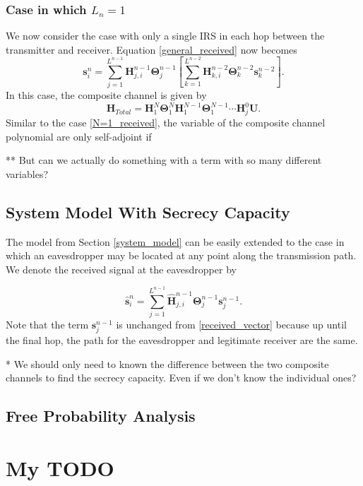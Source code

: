\documentclass[12pt,a4paper]{report}
\begin{document}
\subsection{Case in which $L_n=1$}
We now consider the case with only a single IRS in each hop between the transmitter and receiver. 
Equation \ref{general_received} now becomes 
\begin{equation}\label{L_n=1_received}
\mathbf{s}^{n}_{i} = \sum_{j = 1}^{L^{n-1}} \mathbf{H}^{n-1}_{j,i}\boldsymbol{\Theta}^{n-1}_{j} \left[
\sum_{k = 1}^{L^{n-2}} \mathbf{H}^{n-2}_{k,i}\boldsymbol{\Theta}^{n-2}_{k}\mathbf{s}^{n-2}_{k} \right].
\end{equation}
In this case, the composite channel is given by 
\begin{equation}
\mathbf{H}_{Total} = \mathbf{H}^{N}_{1}\boldsymbol{\Theta}^{N}_{1}\mathbf{H}^{N-1}_{1}\boldsymbol{\Theta}^{N-1}_{1} \cdots  
\mathbf{H}^{0}_{j}\mathbf{U}.
\end{equation}
Similar to the case \ref{N=1_received}, the variable of the composite channel polynomial are only self-adjoint if 

** But can we actually do something with a term with so many different variables?

\section{System Model With Secrecy Capacity}
The model from Section \ref{system_model} can be easily extended to the case in which an eavesdropper may be located at any point along the transmission path. We denote the received signal at the eavesdropper by

\begin{equation}\label{general_received}
\hat{\mathbf{s}}^{n}_{i} = \sum_{j = 1}^{L^{n-1}} \hat{\mathbf{H}}^{n-1}_{j,i}\boldsymbol{\Theta}^{n-1}_{j} \mathbf{s}^{n-1}_{j}.
\end{equation}
Note that the term $\mathbf{s}^{n-1}_{j}$ is unchanged from \ref{received_vector} because up until the final hop, the path for the eavesdropper and legitimate receiver are the same. 

* We should only need to known the difference between the two composite channels to find the secrecy capacity. Even if we don't know the individual ones?
\section{Free Probability Analysis}

\chapter{My TODO}



\end{document}
